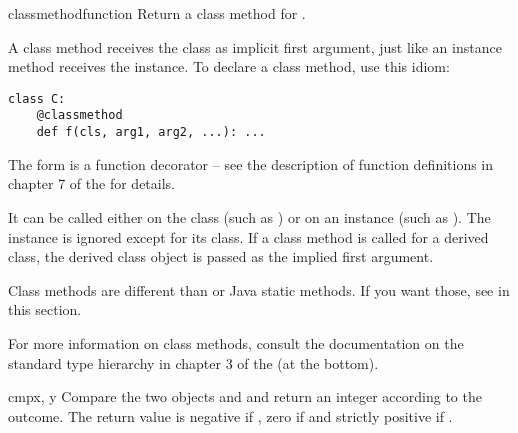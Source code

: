 \begin{funcdesc}{classmethod}{function}
  Return a class method for .

  A class method receives the class as implicit first argument,
  just like an instance method receives the instance.
  To declare a class method, use this idiom:

\begin{verbatim}
class C:
    @classmethod
    def f(cls, arg1, arg2, ...): ...
\end{verbatim}

  The  form is a function decorator -- see the description
  of function definitions in chapter 7 of the
   for details.

  It can be called either on the class (such as ) or on an
  instance (such as ).  The instance is ignored except for
  its class.
  If a class method is called for a derived class, the derived class
  object is passed as the implied first argument.

  Class methods are different than \Cpp{} or Java static methods.
  If you want those, see  in this section.
  
  For more information on class methods, consult the documentation on the
  standard type hierarchy in chapter 3 of the
   (at the bottom).
\end{funcdesc}

\begin{funcdesc}{cmp}{x, y}
  Compare the two objects  and  and return an integer
  according to the outcome.  The return value is negative if , zero if  and strictly positive if
  .
\end{funcdesc}

